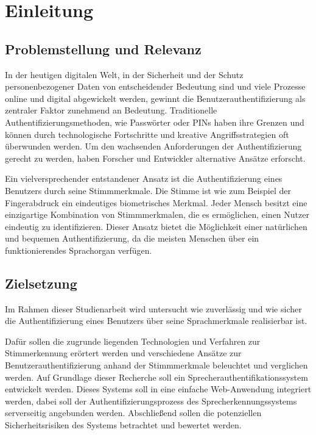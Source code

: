 \section{Einleitung}
\subsection{Problemstellung und Relevanz}

\textauthor{\vLB}{}{}

In der heutigen digitalen Welt, in der Sicherheit und der Schutz personenbezogener Daten von entscheidender Bedeutung sind und viele Prozesse online und digital abgewickelt werden, gewinnt die Benutzerauthentifizierung als zentraler Faktor zunehmend an Bedeutung.
Traditionelle Authentifizierungsmethoden, wie Passwörter oder PINs haben ihre Grenzen und können durch technologische Fortschritte und kreative Angriffsstrategien oft überwunden werden.
Um den wachsenden Anforderungen der Authentifizierung gerecht zu werden, haben Forscher und Entwickler alternative Ansätze erforscht.

Ein vielversprechender entstandener Ansatz ist die Authentifizierung eines Benutzers durch seine Stimmmerkmale.
Die Stimme ist wie zum Beispiel der Fingerabdruck ein eindeutiges biometrisches Merkmal.
Jeder Mensch besitzt eine einzigartige Kombination von Stimmmerkmalen, die es ermöglichen, einen Nutzer eindeutig zu identifizieren.
Dieser Ansatz bietet die Möglichkeit einer natürlichen und bequemen Authentifizierung, da die meisten Menschen über ein funktionierendes Sprachorgan verfügen.


\subsection{Zielsetzung}\label{sec:Zielsetzung}

\textauthor{\vLB}{}{}

Im Rahmen dieser Studienarbeit wird untersucht wie zuverlässig und wie sicher die Authentifizierung eines Benutzers über seine Sprachmerkmale realisierbar ist.

Dafür sollen die zugrunde liegenden Technologien und Verfahren zur Stimmerkennung erörtert werden und verschiedene Ansätze zur Benutzerauthentifizierung anhand der Stimmmerkmale beleuchtet und verglichen werden.
Auf Grundlage dieser Recherche soll ein Sprecherauthentifikationssystem entwickelt werden.
Dieses Systems soll in eine einfache Web-Anwendung integriert werden, dabei soll der Authentifizierungsprozess des Sprecherkennungssystems serverseitig angebunden werden.
Abschließend sollen die potenziellen Sicherheitsrisiken des Systems betrachtet und bewertet werden.

